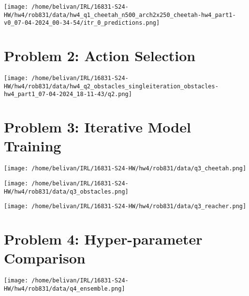 \documentclass{article}
\begin{document}
\begin{answer}[title=Performance Plot Cheetah Env (3),height=9.5cm,width=\linewidth]
\centering
\texttt{[image: /home/belivan/IRL/16831-S24-HW/hw4/rob831/data/hw4\_q1\_cheetah\_n500\_arch2x250\_cheetah-hw4\_part1-v0\_07-04-2024\_00-34-54/itr\_0\_predictions.png]}
\end{answer}

\section{Problem 2: Action Selection}
\begin{answer}[title=Reward Return Plot Obstacles Env,height=9.5cm,width=\linewidth]
\centering
\texttt{[image: /home/belivan/IRL/16831-S24-HW/hw4/rob831/data/hw4\_q2\_obstacles\_singleiteration\_obstacles-hw4\_part1\_07-04-2024\_18-11-43/q2.png]}
\end{answer}



\section{Problem 3: Iterative Model Training}
\begin{answer}[title=Performance Plot Cheetah Env,height=9.5cm,width=\linewidth]
\centering
\texttt{[image: /home/belivan/IRL/16831-S24-HW/hw4/rob831/data/q3\_cheetah.png]}
\end{answer}

\begin{answer}[title=Performance Plot Obstacles Env,height=9.5cm,width=\linewidth]
\centering
\texttt{[image: /home/belivan/IRL/16831-S24-HW/hw4/rob831/data/q3\_obstacles.png]}
\end{answer}

\begin{answer}[title=Performance Plot Reacher Env,height=9.5cm,width=\linewidth]
\centering
\texttt{[image: /home/belivan/IRL/16831-S24-HW/hw4/rob831/data/q3\_reacher.png]}
\end{answer}

\section{Problem 4: Hyper-parameter Comparison}
\begin{answer}[title=Plot,height=9.5cm,width=\linewidth]
\centering
\texttt{[image: /home/belivan/IRL/16831-S24-HW/hw4/rob831/data/q4\_ensemble.png]}
\end{answer}
\end{document}
